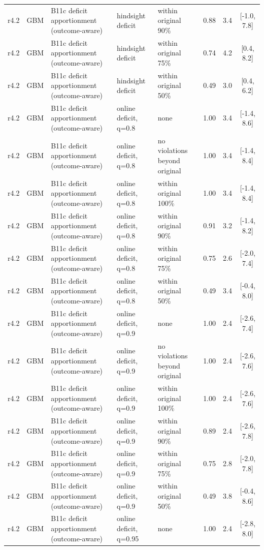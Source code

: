 \documentclass[10pt,onecolumn,letterpaper]{article}
\begin{document}
\begin{longtable}{lllp{4.2cm}p{3.4cm}ccc}
r4.2 & GBM & B11c deficit apportionment (outcome-aware) & hindsight deficit & within original 90\% & 0.88 & 3.4 & [-1.0, 7.8] \\
r4.2 & GBM & B11c deficit apportionment (outcome-aware) & hindsight deficit & within original 75\% & 0.74 & 4.2 & [0.4, 8.2] \\
r4.2 & GBM & B11c deficit apportionment (outcome-aware) & hindsight deficit & within original 50\% & 0.49 & 3.0 & [0.4, 6.2] \\
r4.2 & GBM & B11c deficit apportionment (outcome-aware) & online deficit, q=0.8 & none & 1.00 & 3.4 & [-1.4, 8.6] \\
r4.2 & GBM & B11c deficit apportionment (outcome-aware) & online deficit, q=0.8 & no violations beyond original & 1.00 & 3.4 & [-1.4, 8.4] \\
r4.2 & GBM & B11c deficit apportionment (outcome-aware) & online deficit, q=0.8 & within original 100\% & 1.00 & 3.4 & [-1.4, 8.4] \\
r4.2 & GBM & B11c deficit apportionment (outcome-aware) & online deficit, q=0.8 & within original 90\% & 0.91 & 3.2 & [-1.4, 8.2] \\
r4.2 & GBM & B11c deficit apportionment (outcome-aware) & online deficit, q=0.8 & within original 75\% & 0.75 & 2.6 & [-2.0, 7.4] \\
r4.2 & GBM & B11c deficit apportionment (outcome-aware) & online deficit, q=0.8 & within original 50\% & 0.49 & 3.4 & [-0.4, 8.0] \\
r4.2 & GBM & B11c deficit apportionment (outcome-aware) & online deficit, q=0.9 & none & 1.00 & 2.4 & [-2.6, 7.4] \\
r4.2 & GBM & B11c deficit apportionment (outcome-aware) & online deficit, q=0.9 & no violations beyond original & 1.00 & 2.4 & [-2.6, 7.6] \\
r4.2 & GBM & B11c deficit apportionment (outcome-aware) & online deficit, q=0.9 & within original 100\% & 1.00 & 2.4 & [-2.6, 7.6] \\
r4.2 & GBM & B11c deficit apportionment (outcome-aware) & online deficit, q=0.9 & within original 90\% & 0.89 & 2.4 & [-2.6, 7.8] \\
r4.2 & GBM & B11c deficit apportionment (outcome-aware) & online deficit, q=0.9 & within original 75\% & 0.75 & 2.8 & [-2.0, 7.8] \\
r4.2 & GBM & B11c deficit apportionment (outcome-aware) & online deficit, q=0.9 & within original 50\% & 0.49 & 3.8 & [-0.4, 8.6] \\
r4.2 & GBM & B11c deficit apportionment (outcome-aware) & online deficit, q=0.95 & none & 1.00 & 2.4 & [-2.8, 8.0] \\

\end{longtable}
\end{document}

